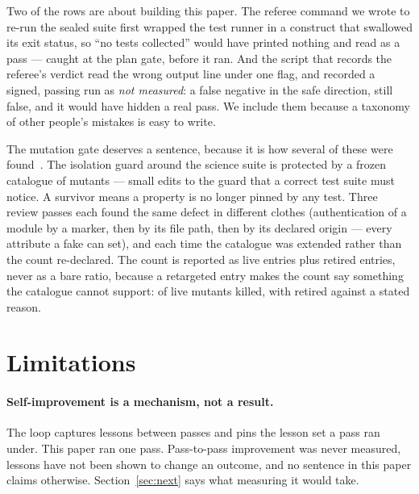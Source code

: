\documentclass[10pt]{article}
\begin{document}
Two of the rows are about building this paper. The referee command we wrote to re-run the sealed suite first wrapped the test runner in a construct that swallowed its exit status, so ``no tests collected'' would have printed nothing and read as a pass --- caught at the plan gate, before it ran. And the script that records the referee's verdict read the wrong output line under one flag, and recorded a signed, passing run as \emph{not measured}: a false negative in the safe direction, still false, and it would have hidden a real pass. We include them because a taxonomy of other people's mistakes is easy to write.

The mutation gate deserves a sentence, because it is how several of these were found~\cite{demillo1978mutation}. The isolation guard around the science suite is protected by a frozen catalogue of mutants --- small edits to the guard that a correct test suite must notice. A survivor means a property is no longer pinned by any test. Three review passes each found the same defect in different clothes (authentication of a module by a marker, then by its file path, then by its declared origin --- every attribute a fake can set), and each time the catalogue was extended rather than the count re-declared. The count is reported as live entries plus retired entries, never as a bare ratio, because a retargeted entry makes the count say something the catalogue cannot support: \claimmutkilled{} of \claimmutlive{} live mutants killed, with \claimmutretired{} retired against a stated reason.

\section{Limitations}\label{sec:limits}

\paragraph{Self-improvement is a mechanism, not a result.} The loop captures lessons between passes and pins the lesson set a pass ran under. This paper ran one pass. Pass-to-pass improvement was never measured, lessons have not been shown to change an outcome, and no sentence in this paper claims otherwise. Section~\ref{sec:next} says what measuring it would take.
\end{document}
